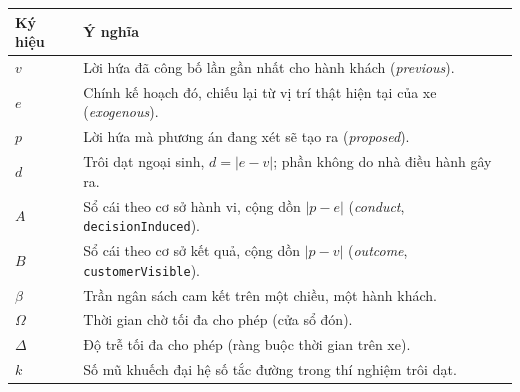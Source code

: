 \begin{longtable}{@{}p{2.6cm}p{12.2cm}@{}}
\toprule
\textbf{Ký hiệu} & \textbf{Ý nghĩa}\\
\midrule
\endhead
$v$ & Lời hứa đã công bố lần gần nhất cho hành khách (\emph{previous}).\\
$e$ & Chính kế hoạch đó, chiếu lại từ vị trí thật hiện tại của xe (\emph{exogenous}).\\
$p$ & Lời hứa mà phương án đang xét sẽ tạo ra (\emph{proposed}).\\
$d$ & Trôi dạt ngoại sinh, $d = |e-v|$; phần không do nhà điều hành gây ra.\\
$A$ & Sổ cái theo cơ sở hành vi, cộng dồn $|p-e|$ (\emph{conduct}, \texttt{decisionInduced}).\\
$B$ & Sổ cái theo cơ sở kết quả, cộng dồn $|p-v|$ (\emph{outcome}, \texttt{customerVisible}).\\
$\beta$ & Trần ngân sách cam kết trên một chiều, một hành khách.\\
$\Omega$ & Thời gian chờ tối đa cho phép (cửa sổ đón).\\
$\Delta$ & Độ trễ tối đa cho phép (ràng buộc thời gian trên xe).\\
$k$ & Số mũ khuếch đại hệ số tắc đường trong thí nghiệm trôi dạt.\\
\bottomrule
\end{longtable}

\clearpage

